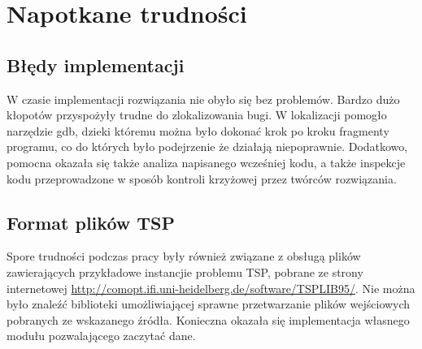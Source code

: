 \section{Napotkane trudności}

\subsection{Błędy implementacji}

W czasie implementacji rozwiązania nie obyło się bez problemów. Bardzo
dużo kłopotów przyspożyły trudne do zlokalizowania bugi. W lokalizacji
pomogło narzędzie gdb, dzieki któremu można było dokonać krok po kroku
fragmenty programu, co do których było podejrzenie że działają niepoprawnie.
Dodatkowo, pomocna okazała się także analiza napisanego wcześniej kodu,
a także inspekcje kodu przeprowadzone w sposób kontroli krzyżowej
przez twórców rozwiązania.

\subsection{Format plików TSP}

Spore trudności podczas pracy były również związane z obsługą plików 
zawierających przykładowe instancjie problemu TSP, pobrane ze strony
internetowej \url{http://comopt.ifi.uni-heidelberg.de/software/TSPLIB95/}.
Nie można było znaleźć biblioteki umożliwiającej sprawne przetwarzanie
plików wejściowych pobranych ze wskazanego źródła. Konieczna okazała
się implementacja własnego modułu pozwalającego zaczytać dane.
